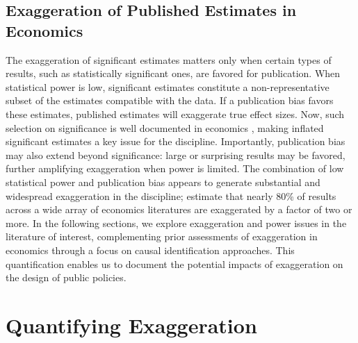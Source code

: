 \documentclass[12pt]{article}
\begin{document}
	\subsection{Exaggeration of Published Estimates in Economics}
	
		The exaggeration of significant estimates matters only when certain types of results, such as statistically significant ones, are favored for publication. When statistical power is low, significant estimates constitute a non-representative subset of the estimates compatible with the data. If a publication bias favors these estimates, published estimates will exaggerate true effect sizes. Now, such selection on significance is well documented in economics \citep{rosenthal_file_1979, brodeur_star_2016, andrews_identification_2019, vivalt_specification_2019, abadie_statistical_2020, brodeur_methods_2020}, making inflated significant estimates a key issue for the discipline. Importantly, publication bias may also extend beyond significance: large or surprising results may be favored, further amplifying exaggeration when power is limited. The combination of low statistical power and publication bias appears to generate substantial and widespread exaggeration in the discipline; \citet{ioannidis_power_2017} estimate that nearly 80\% of results across a wide array of economics literatures are exaggerated by a factor of two or more. In the following sections, we explore exaggeration and power issues in the literature of interest, complementing prior assessments of exaggeration in economics through a focus on causal identification approaches. This quantification enables us to document the potential impacts of exaggeration on the design of public policies.
			



\section{Quantifying Exaggeration}\label{section_lit_review}
\end{document}
